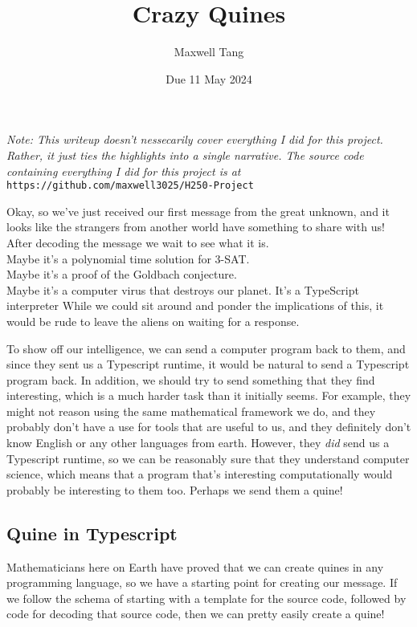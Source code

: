 \documentclass{article}
\title{Crazy Quines}
\author{Maxwell Tang}
\date{Due 11 May 2024}
\begin{document}
\maketitle
\noindent\textit{
Note: This writeup doesn't nessecarily cover everything I did for this project.
Rather, it just ties the highlights into a single narrative.
The source code containing everything I did for this project is at
}\\
\verb|https://github.com/maxwell3025/H250-Project|

\bigbreak

\noindent Okay, so we've just received our first message from the great unknown,
    and it looks like the strangers from another world have something to share with us!
After decoding the message we wait to see what it is. \vspace*{0.25cm}
\\Maybe it's a polynomial time solution for 3-SAT.
\\Maybe it's a proof of the Goldbach conjecture.
\\Maybe it's a computer virus that destroys our planet.
\bigbreak
\noindent It's a TypeScript interpreter \textellipsis
\bigbreak
\noindent While we could sit around and ponder the implications of this,
    it would be rude to leave the aliens on waiting for a response.

To show off our intelligence, we can send a computer program back to them,
    and since they sent us a Typescript runtime,
    it would be natural to send a Typescript program back.
In addition, we should try to send something that they find interesting,
    which is a much harder task than it initially seems.
For example,
    they might not reason using the same mathematical framework we do,
    and they probably don't have a use for tools that are useful to us,
    and they definitely don't know English or any other languages from earth.
However, they \textit{did} send us a Typescript runtime,
    so we can be reasonably sure that they understand computer science,
    which means that a program that's interesting computationally would probably be interesting to them too.
Perhaps we send them a quine!

\subsection*{Quine in Typescript}
Mathematicians here on Earth have proved that we can create quines in any programming language\cite{madore-quines},
    so we have a starting point for creating our message.
If we follow the schema of starting with a template for the source code,
    followed by code for decoding that source code,
    then we can pretty easily create a quine!
\end{document}
